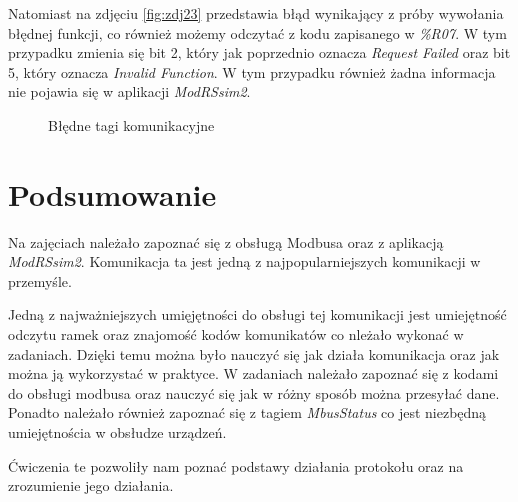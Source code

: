 \documentclass{article}
\begin{document}
Natomiast na zdjęciu \ref{fig:zdj23} przedstawia błąd wynikający z próby wywołania błędnej funkcji, co również możemy odczytać z kodu zapisanego w \textit{\%R07}. W tym przypadku zmienia się bit 2, który jak poprzednio oznacza \textit{Request Failed} oraz bit 5, który oznacza \textit{Invalid Function}. W tym przypadku również żadna informacja nie pojawia się w aplikacji \textit{ModRSsim2}.



\begin{figure}[!ht]
    \centering
    \caption{Błędne tagi komunikacyjne}
    \label{fig:main2}
\end{figure}
\newpage
\section{Podsumowanie}
Na zajęciach należało zapoznać się z obsługą Modbusa oraz z aplikacją \textit{ModRSsim2}. Komunikacja ta jest jedną z najpopularniejszych komunikacji w przemyśle.

Jedną z najważniejszych umięjętności do obsługi tej komunikacji jest umiejętność odczytu ramek oraz znajomość kodów komunikatów co nleżało wykonać w zadaniach. Dzięki temu można było nauczyć się jak działa komunikacja oraz jak można ją wykorzystać w praktyce. W zadaniach należało zapoznać się z kodami do obsługi modbusa oraz nauczyć się jak w różny sposób można przesyłać dane. Ponadto należało również zapoznać się z tagiem \textit{MbusStatus} co jest niezbędną umiejętnościa w obsłudze urządzeń.

Ćwiczenia te pozwoliły nam poznać podstawy działania protokołu oraz na zrozumienie jego działania.
\end{document}
